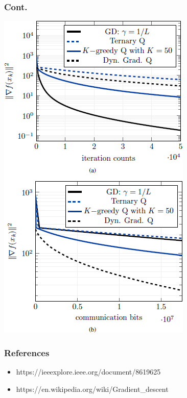 \documentclass{beamer}
\begin{document}
\begin{frame}
\frametitle{Cont.}
\begin{center}
\includegraphics[scale=0.38]{fig.png}
\end{center}


\end{frame}

\begin{frame}
\frametitle{References}
\begin{itemize}
\item {https://ieeexplore.ieee.org/document/8619625}
\item {https://en.wikipedia.org/wiki/Gradient\_descent}
\end{itemize}


\end{frame}

\end{document}
